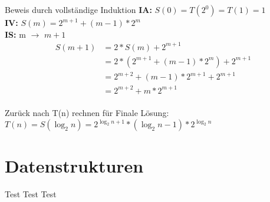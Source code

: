 \documentclass[18pt]{beamer}
\begin{document}
	\begin{frame}{Beweis durch vollständige Induktion}
		\textbf{IA:} $S(0) = T(2^0) = T(1) = 1$ \\
		\textbf{IV:} $S(m) = 2^{m+1} + (m - 1)*2^{m}$\\
		\textbf{IS:} m $\rightarrow$ $m+1$
		\begin{align}
			S(m+1)& = 2 * S(m) + 2^{m+1} \\
			& = 2 * ( 2^{m+1} + (m-1) * 2^m) + 2^{m+1} \\
			& = 2^{m+2} + (m-1) * 2^{m+1} + 2^{m+1} \\
			& = 2^{m+2} + m * 2^{m+1}
		\end{align}
		\ \\
		Zurück nach T(n) rechnen für Finale Lösung: \\
		$T(n) = S(\log _2 n) = 2^{\log _2 n + 1} * (\log _2 n - 1) * 2 ^{\log _2 n}$
	\end{frame}


\section{Datenstrukturen}
	\begin{frame}{Test Test}
		Test
	\end{frame}
\end{document}
